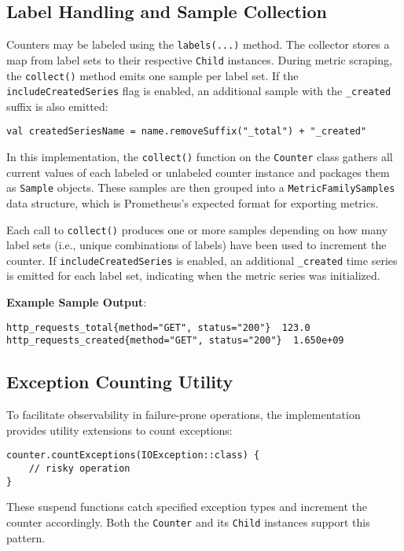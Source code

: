 \subsection{Label Handling and Sample Collection}
Counters may be labeled using the \texttt{labels(...)} method. The collector stores a map from label sets to their respective \texttt{Child} instances. During metric scraping, the \texttt{collect()} method emits one sample per label set. If the \texttt{includeCreatedSeries} flag is enabled, an additional sample with the \texttt{\_created} suffix is also emitted:
\begin{verbatim}
val createdSeriesName = name.removeSuffix("_total") + "_created"
\end{verbatim}


In this implementation, the \texttt{collect()} function on the \texttt{Counter} class gathers all current values of each labeled or unlabeled counter instance and packages them as \texttt{Sample} objects. These samples are then grouped into a \texttt{MetricFamilySamples} data structure, which is Prometheus's expected format for exporting metrics.

Each call to \texttt{collect()} produces one or more samples depending on how many label sets (i.e., unique combinations of labels) have been used to increment the counter. If \texttt{includeCreatedSeries} is enabled, an additional \texttt{\_created} time series is emitted for each label set, indicating when the metric series was initialized.

\vspace{0.5em}
\noindent
\textbf{Example Sample Output}:
\begin{verbatim}
http_requests_total{method="GET", status="200"}  123.0
http_requests_created{method="GET", status="200"}  1.650e+09
\end{verbatim}


\subsection{Exception Counting Utility}
To facilitate observability in failure-prone operations, the implementation provides utility extensions to count exceptions:
\begin{verbatim}
counter.countExceptions(IOException::class) {
    // risky operation
}
\end{verbatim}
These suspend functions catch specified exception types and increment the counter accordingly. Both the \texttt{Counter} and its \texttt{Child} instances support this pattern.



